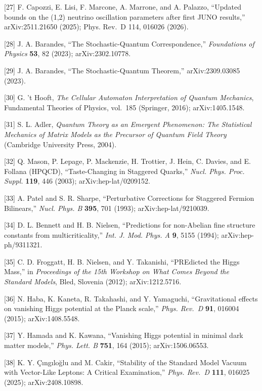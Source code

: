 \documentclass[
]{article}
\begin{document}
{[}27{]} F. Capozzi, E. Lisi, F. Marcone, A. Marrone, and A. Palazzo,
``Updated bounds on the (1,2) neutrino oscillation parameters after
first JUNO results,'' arXiv:2511.21650 (2025); Phys. Rev.~D 114, 016026
(2026).

{[}28{]} J. A. Barandes, ``The Stochastic-Quantum Correspondence,''
\emph{Foundations of Physics} \textbf{53}, 82 (2023); arXiv:2302.10778.

{[}29{]} J. A. Barandes, ``The Stochastic-Quantum Theorem,''
arXiv:2309.03085 (2023).

{[}30{]} G. 't Hooft, \emph{The Cellular Automaton Interpretation of
Quantum Mechanics}, Fundamental Theories of Physics, vol.~185 (Springer,
2016); arXiv:1405.1548.

{[}31{]} S. L. Adler, \emph{Quantum Theory as an Emergent Phenomenon:
The Statistical Mechanics of Matrix Models as the Precursor of Quantum
Field Theory} (Cambridge University Press, 2004).

{[}32{]} Q. Mason, P. Lepage, P. Mackenzie, H. Trottier, J. Hein, C.
Davies, and E. Follana (HPQCD), ``Taste-Changing in Staggered Quarks,''
\emph{Nucl. Phys. Proc. Suppl.} \textbf{119}, 446 (2003);
arXiv:hep-lat/0209152.

{[}33{]} A. Patel and S. R. Sharpe, ``Perturbative Corrections for
Staggered Fermion Bilinears,'' \emph{Nucl. Phys. B} \textbf{395}, 701
(1993); arXiv:hep-lat/9210039.

{[}34{]} D. L. Bennett and H. B. Nielsen, ``Predictions for non-Abelian
fine structure constants from multicriticality,'' \emph{Int. J. Mod.
Phys. A} \textbf{9}, 5155 (1994); arXiv:hep-ph/9311321.

{[}35{]} C. D. Froggatt, H. B. Nielsen, and Y. Takanishi, ``PREdicted
the Higgs Mass,'' in \emph{Proceedings of the 15th Workshop on What
Comes Beyond the Standard Models}, Bled, Slovenia (2012);
arXiv:1212.5716.

{[}36{]} N. Haba, K. Kaneta, R. Takahashi, and Y. Yamaguchi,
``Gravitational effects on vanishing Higgs potential at the Planck
scale,'' \emph{Phys. Rev.~D} \textbf{91}, 016004 (2015);
arXiv:1408.5548.

{[}37{]} Y. Hamada and K. Kawana, ``Vanishing Higgs potential in minimal
dark matter models,'' \emph{Phys. Lett. B} \textbf{751}, 164 (2015);
arXiv:1506.06553.

{[}38{]} K. Y. Çıngıloğlu and M. Cakir, ``Stability of the Standard
Model Vacuum with Vector-Like Leptons: A Critical Examination,''
\emph{Phys. Rev.~D} \textbf{111}, 016025 (2025); arXiv:2408.10898.
\end{document}
